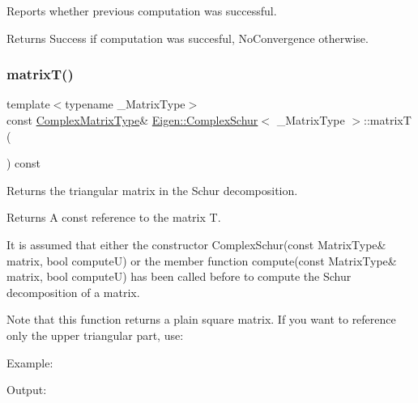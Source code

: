 Reports whether previous computation was successful. 

\begin{DoxyReturn}{Returns}
{\ttfamily Success} if computation was succesful, {\ttfamily No\+Convergence} otherwise. 
\end{DoxyReturn}
\mbox{\label{class_eigen_1_1_complex_schur_add3ab5ed83f7f2f06b79fa910a2d5684}} 
\subsubsection{\texorpdfstring{matrixT()}{matrixT()}}
{\footnotesize\ttfamily template$<$typename \+\_\+\+Matrix\+Type$>$ \\
const \mbox{\hyperlink{class_eigen_1_1_complex_schur_af61fe57877d51cfb50178f78534042f0}{Complex\+Matrix\+Type}}\& \mbox{\hyperlink{class_eigen_1_1_complex_schur}{Eigen\+::\+Complex\+Schur}}$<$ \+\_\+\+Matrix\+Type $>$\+::matrixT (\begin{DoxyParamCaption}{ }\end{DoxyParamCaption}) const\hspace{0.3cm}{\ttfamily [inline]}}



Returns the triangular matrix in the Schur decomposition. 

\begin{DoxyReturn}{Returns}
A const reference to the matrix T.
\end{DoxyReturn}
It is assumed that either the constructor Complex\+Schur(const Matrix\+Type\& matrix, bool compute\+U) or the member function compute(const Matrix\+Type\& matrix, bool compute\+U) has been called before to compute the Schur decomposition of a matrix.

Note that this function returns a plain square matrix. If you want to reference only the upper triangular part, use\+: 
\begin{DoxyCode}{0}
\end{DoxyCode}


Example\+: 
\begin{DoxyCodeInclude}{0}
\end{DoxyCodeInclude}
 Output\+: 
\begin{DoxyVerbInclude}
\end{DoxyVerbInclude}
 \mbox{\label{class_eigen_1_1_complex_schur_afed8177cf9836f032d42bdb6c6bc6e01}} 

